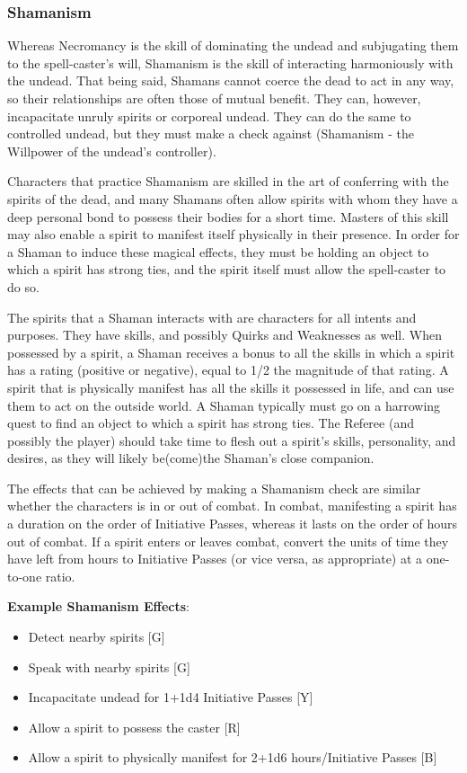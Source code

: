 \documentclass[oneside]{book}
\begin{document}
\begin{multicols}{2}
\subsubsection{Shamanism}
Whereas Necromancy is the skill of dominating the undead and subjugating them to the spell-caster's will, Shamanism is the skill of interacting harmoniously with the undead. That being said, Shamans cannot coerce the dead to act in any way, so their relationships are often those of mutual benefit. They can, however, incapacitate unruly spirits or corporeal undead. They can do the same to controlled undead, but they must make a check against (Shamanism - the Willpower of the undead's controller).

Characters that practice Shamanism are skilled in the art of conferring with the spirits of the dead, and many Shamans often allow spirits with whom they have a deep personal bond to possess their bodies for a short time. Masters of this skill may also enable a spirit to manifest itself physically in their presence. In order for a Shaman to induce these magical effects, they must be holding an object to which a spirit has strong ties, and the spirit itself must allow the spell-caster to do so. 

The spirits that a Shaman interacts with are characters for all intents and purposes. They have skills, and possibly Quirks and Weaknesses as well. When possessed by a spirit, a Shaman receives a bonus to all the skills in which a spirit has a rating (positive or negative), equal to 1/2 the magnitude of that rating. A spirit that is physically manifest has all the skills it possessed in life, and can use them to act on the outside world. A Shaman typically must go on a harrowing quest to find an object to which a spirit has strong ties. The Referee (and possibly the player) should take time to flesh out a spirit's skills, personality, and desires, as they will likely be(come)the Shaman's close companion.

The effects that can be achieved by making a Shamanism check are similar whether the characters is in or out of combat. In combat, manifesting a spirit has a duration on the order of Initiative Passes, whereas it lasts on the order of hours out of combat. If a spirit enters or leaves combat, convert the units of time they have left from hours to Initiative Passes (or vice versa, as appropriate) at a one-to-one ratio. 

\textbf{Example Shamanism Effects}: 
	\begin{itemize}
		\setlength{\itemsep}{0cm}%
  		\setlength{\parskip}{0cm}%
		\item{ \small Detect nearby spirits [G]}
		\item{ \small Speak with nearby spirits [G]}
		\item{ \small Incapacitate undead for 1+1d4 Initiative Passes [Y]}
		\item{ \small Allow a spirit to possess the caster [R]}
		\item{ \small Allow a spirit to physically manifest for 2+1d6 hours/Initiative Passes [B]}
	\end{itemize}


\end{multicols}
\end{document}
